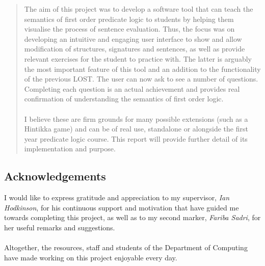 \documentclass{report}
\begin{document}
\begin{abstract}
The aim of this project was to develop a software tool that can teach the 
semantics of first order predicate logic to students by helping them visualise 
the process of sentence evaluation. Thus, the focus was on developing an 
intuitive and engaging user interface to show and allow modification of 
structures, signatures and sentences, as well as provide relevant exercises for 
the student to practice with. The latter is arguably the most important feature 
of this tool and an addition to the functionality of the previous LOST. The user
can now ask to see a number of questions. Completing each question is an 
actual achievement and provides real confirmation of understanding the semantics
of first order logic. 
\\ \\
I believe these are firm grounds for many possible extensions (such as a
Hintikka game) and can be of real use, standalone or alongside the first year
predicate logic course. This report will provide further detail of its 
implementation and purpose.
\end{abstract}


\subsection*{\centering Acknowledgements}
I would like to express gratitude and appreciation to my supervisor, \emph{Ian 
Hodkinson}, for his continuous support and motivation that have guided me 
towards completing this project, as well as to my second marker, \emph{Fariba
Sadri}, for her useful remarks and suggestions.
\\ \\
Altogether, the resources, staff and students of the Department of Computing 
have made working on this project enjoyable every day.

    \tableofcontents

\end{document}

